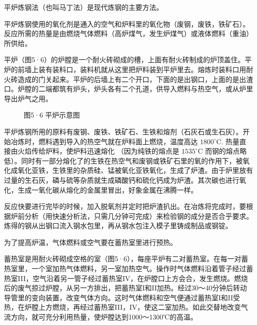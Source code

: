 平炉炼钢法（也叫马丁法）是现代炼钢的主要方法。

平炉炼钢使用的氧化剂是通入的空气和炉料里的氧化物（废钢，废铁，铁矿石）。反应所需的热量是由燃烧气体燃料（高炉煤气，发生炉煤气）或液体燃料（重油）所供给。

平炉（图5·6）的炉膛是一个耐火砖砌成的槽，上面有耐火砖制成的炉顶盖住。平炉的前墙上装有装料口，装料机就从这里把炉料装到平炉里去。熔炼时装料口用耐火砖造成的门关起来。平炉的后墙上有二个开口，下面的是出钢口，上面的是出渣口。炉膛的二端都筑有炉头，炉头各有二个孔道，供导入燃料与热空气，或从炉里导出炉气之用。

\begin{figure}
\centering
\caption{图5·6 平炉示意图}
\end{figure}

平炉炼钢所用的原料有废钢、废铁、铁矿石、生铁和熔剂（石灰石或生石灰）。开始冶炼时，燃料遇到导入的热空气就在炉料面上燃烧，温度高达
\(1800^{\circ} \mathrm{C}\). 热量直接由火焰传给炉料，使炉料迅速熔化
（因为纯铁的熔点是 \(1535^{\circ} \mathrm{C}\)
而钢的熔点略低）。同时有一部分熔化了的生铁在热空气和废钢或铁矿石里的氧的作用下，被氧化成氧化亚铁，生铁里的杂质硅、锰被氧化亚铁氧化，生成了炉渣。由于炉里放有过量的生石灰，磷与硫等杂质就生成磷酸钙和硫化钙成为炉渣。其次碳也进行氧化，生成一氧化碳从熔化的金属里冒出，好象金属在沸腾一样。

反应快要进行完毕的时候，加入脱氧剂并定时把炉渣扒出。在冶炼将完成时，要根据炉前分析（用快速分析法，只需几分钟可完成）来检验钢的成分是否合乎要求。炼得的钢从出钢口流入钢水包里，再从钢水包注入模子里铸成制品或钢锭。

为了提高炉温，气体燃料或空气要在蓄热室里进行预热。

蓄热室是用耐火砖砌成空格的室（图5·6），每座平炉有二对蓄热室。在每一对蓄热室里，一个室加热气体燃料，另一室加热空气。操作时气体燃料沿着管子经过蓄热室III，空气沿着另一管子经过蓄热室IV，在炉膛口上方会合，发生燃烧。燃烧后的废气掠过炉膛，从另一方排出，把蓄热室I和II加热。经过30～40分钟后转动导管里的变向装置，改变气体方向。这时气体燃料和空气便通过蓄热室I和II受热，在炉膛上方燃烧，再经过蓄热室III，IV，使这二室加热。如此交替地改变气流方向，就可充分利用热量，使炉膛达到1000～1300℃的高温。

